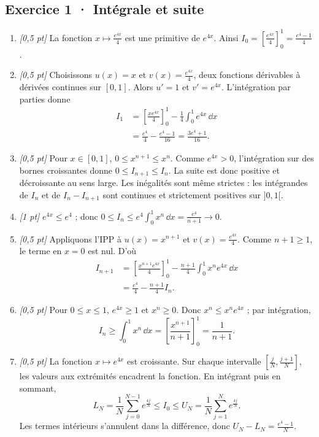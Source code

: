 \subsection*{Exercice 1 · Intégrale et suite}\begin{enumerate}

\item \textit{[0,5 pt]} La fonction $x\mapsto \frac{e^{4x}}{4}$ est une primitive de $e^{4x}$. Ainsi $I_0=[\frac{e^{4x}}{4}]_0^1=\frac{e^{4}-1}{4}$.

\item \textit{[0,5 pt]} Choisissons $u(x)=x$ et $v(x)=\frac{e^{4x}}{4}$, deux fonctions dérivables à dérivées continues sur $[0,1]$. Alors $u'=1$ et $v'=e^{4x}$. L'intégration par parties donne
\[\begin{aligned}I_1&=\left[\frac{xe^{4x}}{4}\right]_0^1-\frac{1}{4}\int_0^1e^{4x}\,\dd x\\&=\frac{e^{4}}{4}-\frac{e^{4}-1}{16}=\frac{3e^{4}+1}{16}.\end{aligned}\]

\item \textit{[0,5 pt]} Pour $x\in[0,1]$, $0\le x^{n+1}\le x^n$. Comme $e^{4x}>0$, l'intégration sur des bornes croissantes donne $0\le I_{n+1}\le I_n$. La suite est donc positive et décroissante au sens large. Les inégalités sont même strictes : les intégrandes de $I_n$ et de $I_n-I_{n+1}$ sont continues et strictement positives sur $]0,1[$.

\item \textit{[1 pt]} $e^{4x}\le e^{4}$ ; donc $0\le I_n\le e^{4}\int_0^1x^n\,\dd x=\frac{e^{4}}{n+1}\to0$.

\item \textit{[0,5 pt]} Appliquons l'IPP à $u(x)=x^{n+1}$ et $v(x)=\frac{e^{4x}}{4}$. Comme $n+1\ge1$, le terme en $x=0$ est nul. D'où
\[\begin{aligned}I_{n+1}&=\left[\frac{x^{n+1}e^{4x}}{4}\right]_0^1-\frac{n+1}{4}\int_0^1x^ne^{4x}\,\dd x\\&=\frac{e^{4}}{4}-\frac{n+1}{4}I_n.\end{aligned}\]

\item \textit{[0,5 pt]} Pour $0\le x\le1$, $e^{4x}\ge1$ et $x^n\ge0$. Donc $x^n\le x^ne^{4x}$ ; par intégration,
\[I_n\ge\int_0^1x^n\,\dd x=\left[\frac{x^{n+1}}{n+1}\right]_0^1=\frac{1}{n+1}.\]

\item \textit{[0,5 pt]} La fonction $x\mapsto e^{4x}$ est croissante. Sur chaque intervalle $[\frac{j}{N},\frac{j+1}{N}]$, les valeurs aux extrémités encadrent la fonction. En intégrant puis en sommant,
\[L_N=\frac{1}{N}\sum_{j=0}^{N-1}e^{\frac{4j}{N}}\le I_0\le U_N=\frac{1}{N}\sum_{j=1}^Ne^{\frac{4j}{N}}.\]
Les termes intérieurs s'annulent dans la différence, donc $U_N-L_N=\frac{e^{4}-1}{N}$.


\end{enumerate}
